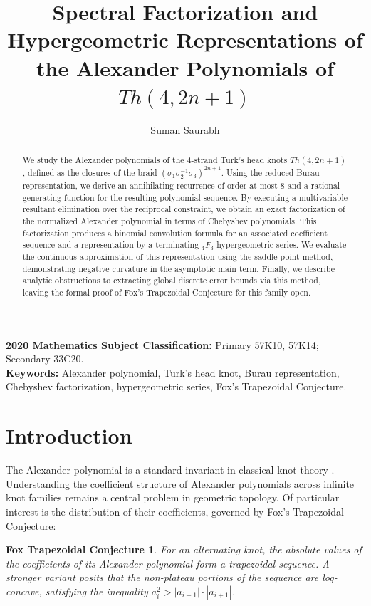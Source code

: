 \documentclass[11pt]{article}
\title{Spectral Factorization and Hypergeometric Representations of the Alexander Polynomials of $Th(4,2n+1)$
}
\author{Suman Saurabh}
\date{\vspace{-4ex}}
\newtheorem*{foxconjecture}{Fox Trapezoidal Conjecture}
\begin{document}
\maketitle

\begin{abstract}
We study the Alexander polynomials of the 4-strand Turk's head knots $Th(4,2n+1)$, defined as the closures of the braid $(\sigma_1\sigma_2^{-1}\sigma_3)^{2n+1}$. Using the reduced Burau representation, we derive an annihilating recurrence of order at most 8 and a rational generating function for the resulting polynomial sequence. By executing a multivariable resultant elimination over the reciprocal constraint, we obtain an exact factorization of the normalized Alexander polynomial in terms of Chebyshev polynomials. This factorization produces a binomial convolution formula for an associated coefficient sequence and a representation by a terminating ${}_4F_3$ hypergeometric series. We evaluate the continuous approximation of this representation using the saddle-point method, demonstrating negative curvature in the asymptotic main term. Finally, we describe analytic obstructions to extracting global discrete error bounds via this method, leaving the formal proof of Fox's Trapezoidal Conjecture for this family open.
\end{abstract}

\vspace{0.5cm}
\noindent \textbf{2020 Mathematics Subject Classification:} Primary 57K10, 57K14; Secondary 33C20. \\
\textbf{Keywords:} Alexander polynomial, Turk's head knot, Burau representation, Chebyshev factorization, hypergeometric series, Fox's Trapezoidal Conjecture.

\section{Introduction}

The Alexander polynomial is a standard invariant in classical knot theory \cite{Kawauchi1996, Lickorish1997, Rolfsen1976}. Understanding the coefficient structure of Alexander polynomials across infinite knot families remains a central problem in geometric topology. Of particular interest is the distribution of their coefficients, governed by Fox's Trapezoidal Conjecture:

\begin{foxconjecture}
For an alternating knot, the absolute values of the coefficients of its Alexander polynomial form a trapezoidal sequence. A stronger variant posits that the non-plateau portions of the sequence are log-concave, satisfying the inequality $a_i^2 > |a_{i-1}| \cdot |a_{i+1}|$.
\end{foxconjecture}
\end{document}
